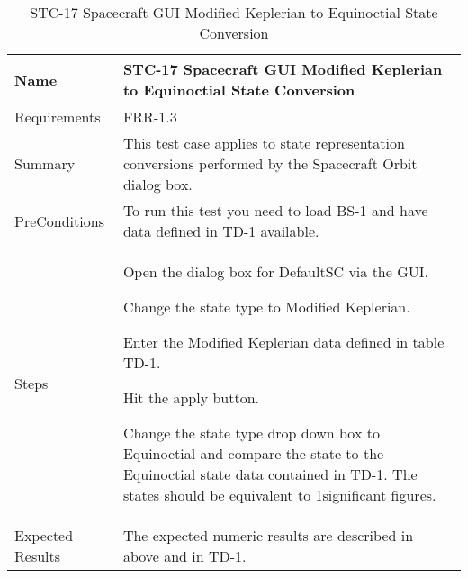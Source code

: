 
\begin{table}[htbp!]
\centering
      \begin{tabular}{|p{1.05 in} |p{4.75 in} |}
      \hline
         \rowcolor[rgb]{0.8,0.8,0.8} Name & STC-17 Spacecraft GUI Modified Keplerian to Equinoctial State Conversion\\
         \hline
         Requirements & FRR-1.3\\ \hline
         Summary &
         This test case applies to state representation conversions performed by the Spacecraft Orbit dialog box. \\
         \hline
         PreConditions & To run this test you need to load BS-1 and have data defined in TD-1 available.\\
         \hline
         Steps &
         \begin{compactenum}
         \item Open the dialog box for DefaultSC via the GUI.
         \item Change the state type to Modified Keplerian.
         \item Enter the Modified Keplerian data defined in table TD-1.
         \item Hit the apply button.
         \item Change the state type drop down box to Equinoctial and compare the state to the
         Equinoctial state data contained in TD-1. The states should be equivalent to 1significant figures.
         \end{compactenum}\\
         \hline
         Expected Results & The expected numeric results are described in above and in TD-1.\\
      \hline
\end{tabular}
      \label{Table: STC-17}
      \caption{STC-17 Spacecraft GUI Modified Keplerian to Equinoctial State Conversion}
\end{table} 
